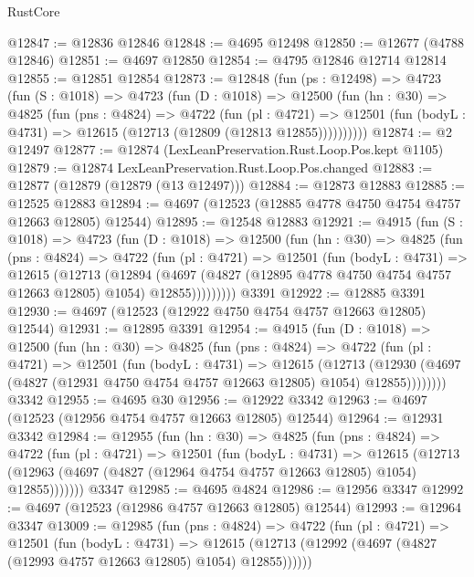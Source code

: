 \begin{lexlean}{RustCore}
\begin{coremodule}
@12847 := @12836 @12846
@12848 := @4695 @12498
@12850 := @12677 (@4788 @12846)
@12851 := @4697 @12850
@12854 := @4795 @12846 @12714 @12814
@12855 := @12851 @12854
@12873 := @12848
    (fun (ps : @12498) =>
    @4723
      (fun (S : @1018) =>
      @4723
        (fun (D : @1018) =>
        @12500
          (fun (hn : @30) =>
          @4825
            (fun (pns : @4824) =>
            @4722
              (fun (pl : @4721) =>
              @12501 (fun (bodyL : @4731) => @12615 (@12713 (@12809 (@12813 @12855))))))))))
@12874 := @2 @12497
@12877 := @12874 (LexLeanPreservation.Rust.Loop.Pos.kept @1105)
@12879 := @12874 LexLeanPreservation.Rust.Loop.Pos.changed
@12883 := @12877 (@12879 (@12879 (@13 @12497)))
@12884 := @12873 @12883
@12885 := @12525 @12883
@12894 := @4697 (@12523 (@12885 @4778 @4750 @4754 @4757 @12663 @12805) @12544)
@12895 := @12548 @12883
@12921 := @4915
    (fun (S : @1018) =>
    @4723
      (fun (D : @1018) =>
      @12500
        (fun (hn : @30) =>
        @4825
          (fun (pns : @4824) =>
          @4722
            (fun (pl : @4721) =>
            @12501
              (fun (bodyL : @4731) =>
              @12615
                (@12713
                  (@12894
                    (@4697
                      (@4827 (@12895 @4778 @4750 @4754 @4757 @12663 @12805) @1054)
                      @12855)))))))))
    @3391
@12922 := @12885 @3391
@12930 := @4697 (@12523 (@12922 @4750 @4754 @4757 @12663 @12805) @12544)
@12931 := @12895 @3391
@12954 := @4915
    (fun (D : @1018) =>
    @12500
      (fun (hn : @30) =>
      @4825
        (fun (pns : @4824) =>
        @4722
          (fun (pl : @4721) =>
          @12501
            (fun (bodyL : @4731) =>
            @12615
              (@12713
                (@12930 (@4697 (@4827 (@12931 @4750 @4754 @4757 @12663 @12805) @1054) @12855))))))))
    @3342
@12955 := @4695 @30
@12956 := @12922 @3342
@12963 := @4697 (@12523 (@12956 @4754 @4757 @12663 @12805) @12544)
@12964 := @12931 @3342
@12984 := @12955
    (fun (hn : @30) =>
    @4825
      (fun (pns : @4824) =>
      @4722
        (fun (pl : @4721) =>
        @12501
          (fun (bodyL : @4731) =>
          @12615
            (@12713 (@12963 (@4697 (@4827 (@12964 @4754 @4757 @12663 @12805) @1054) @12855)))))))
    @3347
@12985 := @4695 @4824
@12986 := @12956 @3347
@12992 := @4697 (@12523 (@12986 @4757 @12663 @12805) @12544)
@12993 := @12964 @3347
@13009 := @12985
    (fun (pns : @4824) =>
    @4722
      (fun (pl : @4721) =>
      @12501
        (fun (bodyL : @4731) =>
        @12615 (@12713 (@12992 (@4697 (@4827 (@12993 @4757 @12663 @12805) @1054) @12855))))))

\end{coremodule}
\end{lexlean}
